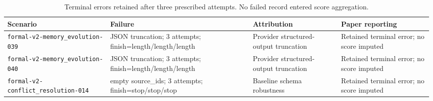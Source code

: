 \begin{table}[t]
\centering\small
\setlength{\tabcolsep}{4pt}
\caption{Terminal errors retained after three prescribed attempts. No failed record entered score aggregation.}
\label{tab:errors}
\begin{tabular}{p{}p{}p{}p{}}
\toprule Scenario & Failure & Attribution & Paper reporting \\
\midrule
\texttt{formal-v2-memory\_\allowbreak{}evolution-039} & JSON truncation; 3 attempts; finish=length/length/length & Provider structured-output truncation & Retained terminal error; no score imputed \\
\texttt{formal-v2-memory\_\allowbreak{}evolution-040} & JSON truncation; 3 attempts; finish=length/length/length & Provider structured-output truncation & Retained terminal error; no score imputed \\
\texttt{formal-v2-conflict\_\allowbreak{}resolution-014} & empty source\_ids; 3 attempts; finish=stop/stop/stop & Baseline schema robustness & Retained terminal error; no score imputed \\
\bottomrule
\end{tabular}
\end{table}
